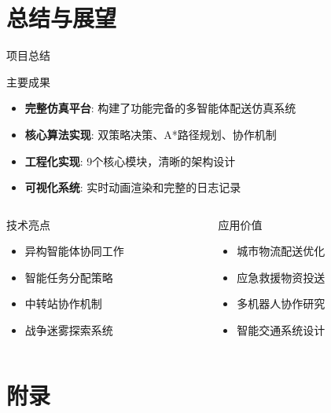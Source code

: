 \documentclass[
10pt,
aspectratio=169,
]{beamer}
\begin{document}

\section{总结与展望}

\begin{frame}{项目总结}
    \begin{block}{主要成果}
        \begin{itemize}
            \item \textbf{完整仿真平台}: 构建了功能完备的多智能体配送仿真系统
            \item \textbf{核心算法实现}: 双策略决策、A*路径规划、协作机制
            \item \textbf{工程化实现}: 9个核心模块，清晰的架构设计
            \item \textbf{可视化系统}: 实时动画渲染和完整的日志记录
        \end{itemize}
    \end{block}
    
    \begin{columns}
        \begin{column}{0.5\textwidth}
            \begin{exampleblock}{技术亮点}
                \begin{itemize}
                    \item 异构智能体协同工作
                    \item 智能任务分配策略
                    \item 中转站协作机制
                    \item 战争迷雾探索系统
                \end{itemize}
            \end{exampleblock}
        \end{column}
        \begin{column}{0.5\textwidth}
            \begin{alertblock}{应用价值}
                \begin{itemize}
                    \item 城市物流配送优化
                    \item 应急救援物资投送
                    \item 多机器人协作研究
                    \item 智能交通系统设计
                \end{itemize}
            \end{alertblock}
        \end{column}
    \end{columns}
\end{frame}


\section{附录}

%
\end{document}
